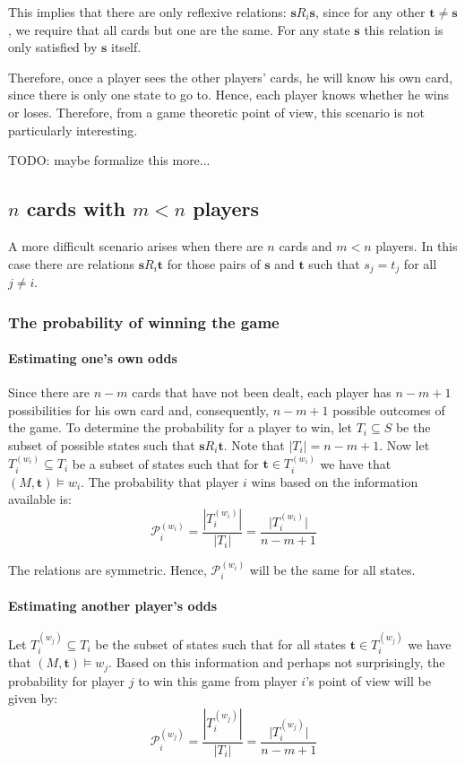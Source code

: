 \documentclass[a4paper,10pt]{article}
\begin{document}
This implies that there are only reflexive relations: $\boldsymbol s R_i \boldsymbol s$, since for any other $\boldsymbol t \neq \boldsymbol s$, we require that all cards but one are the same. For any state $\boldsymbol s$ this relation is only satisfied by $\boldsymbol s$ itself.

Therefore, once a player sees the other players' cards, he will know his own card, since there is only one state to go to. Hence, each player knows whether he wins or loses. Therefore, from a game theoretic point of view, this scenario is not particularly interesting.

TODO: maybe formalize this more...

\subsection{$n$ cards with $m<n$ players}
A more difficult scenario arises when there are $n$ cards and $m < n$ players. In this case there are relations $\boldsymbol s R_i \boldsymbol t$ for those pairs of $\boldsymbol s$ and $\boldsymbol t$ such that $s_j = t_j$ for all $j\neq i$.

\subsubsection{The probability of winning the game}

\paragraph{Estimating one's own odds}
Since there are $n-m$ cards that have not been dealt, each player has $n-m+1$ possibilities for his own card and, consequently, $n-m+1$ possible outcomes of the game. To determine the probability for a player to win, let $T_i \subseteq S$ be the subset of possible states such that $\boldsymbol s R_i \boldsymbol t$. Note that $|T_i| = n-m+1$. Now let $T^{(w_i)}_i \subseteq T_i$ be a subset of states such that for $\boldsymbol t \in T^{(w_i)}_i$ we have that $(M,\boldsymbol t) \models w_i$. The probability that player $i$ wins based on the information available is:
\begin{equation}
\mathcal{P}^{(w_i)}_i = \frac{|T^{(w_i)}_i|}{|T_i|} = \frac{\lvert T^{(w_i)}_i\rvert}{n-m+1}
\end{equation}

The relations are symmetric. Hence, $\mathcal{P}^{(w_i)}_i$ will be the same for all states.

\paragraph{Estimating another player's odds}
Let $T^{(w_j)}_i \subseteq T_i$ be the subset of states such that for all states $\boldsymbol t \in T^{(w_j)}_i$ we have that $(M,\boldsymbol t) \models w_j$. Based on this information and perhaps not surprisingly, the probability for player $j$ to win this game from player $i$'s point of view will be given by:
\begin{equation}
\mathcal{P}^{(w_j)}_i = \frac{|T^{(w_j)}_i|}{|T_i|} = \frac{\lvert T^{(w_j)}_i\rvert}{n-m+1} \label{eq:prob}
\end{equation}
\end{document}
